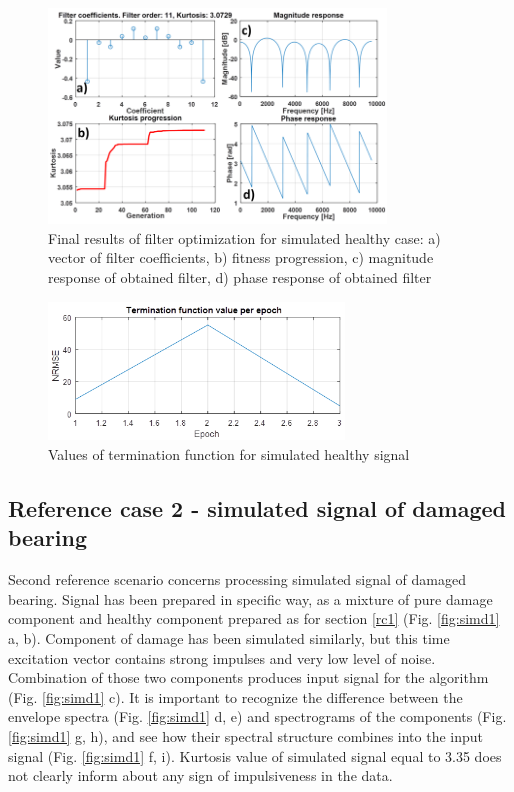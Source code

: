 \documentclass[preprint,12pt]{elsarticle}
\begin{document}
\begin{figure}[ht!]
\centering
\includegraphics[width=0.8\textwidth]{wykresy/simh2.png}
\caption{Final results of filter optimization for simulated healthy case: a) vector of filter coefficients, b) fitness progression, c) magnitude response of obtained filter, d) phase response of obtained filter}
\label{fig:simh2}
\end{figure}

\begin{figure}[ht!]
\centering
\includegraphics[width=0.7\textwidth]{wykresy/simh3.png}
\caption{Values of termination function for simulated healthy signal}
\label{fig:simh3}
\end{figure}

\subsection{Reference case 2 - simulated signal of damaged bearing}

Second reference scenario concerns processing simulated signal of damaged bearing. Signal has been prepared in specific way, as a mixture of pure damage component and healthy component prepared as for section \ref{rc1} (Fig. \ref{fig:simd1} a, b). Component of damage has been simulated similarly, but this time excitation vector contains strong impulses and very low level of noise. Combination of those two components produces input signal for the algorithm (Fig. \ref{fig:simd1} c). It is important to recognize the difference between the envelope spectra (Fig. \ref{fig:simd1} d, e) and spectrograms of the components (Fig. \ref{fig:simd1} g, h), and see how their spectral structure combines into the input signal (Fig. \ref{fig:simd1} f, i). Kurtosis value of simulated signal equal to 3.35 does not clearly inform about any sign of impulsiveness in the data. 
\end{document}
